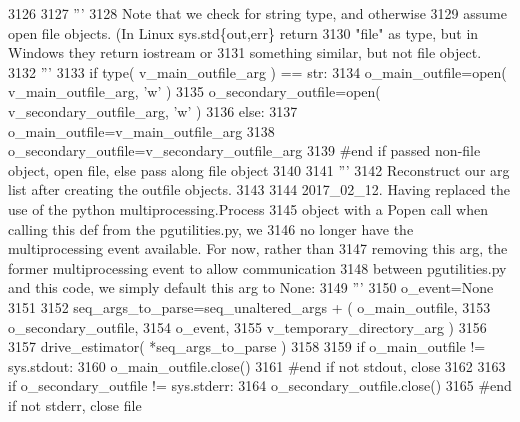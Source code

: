 \begin{DoxyCode}
3126 
3127         \textcolor{stringliteral}{'''}
3128 \textcolor{stringliteral}{        Note that we check for string type, and otherwise}
3129 \textcolor{stringliteral}{        assume open file objects. (In Linux sys.std\{out,err\} return}
3130 \textcolor{stringliteral}{        "file" as type, but in Windows they return iostream or}
3131 \textcolor{stringliteral}{        something similar, but not file object.}
3132 \textcolor{stringliteral}{        '''}
3133         \textcolor{keywordflow}{if} type( v\_main\_outfile\_arg  ) == str:
3134             o\_main\_outfile=open( v\_main\_outfile\_arg, \textcolor{stringliteral}{'w'} )
3135             o\_secondary\_outfile=open( v\_secondary\_outfile\_arg, \textcolor{stringliteral}{'w'} )
3136         \textcolor{keywordflow}{else}:
3137             o\_main\_outfile=v\_main\_outfile\_arg
3138             o\_secondary\_outfile=v\_secondary\_outfile\_arg
3139         \textcolor{comment}{#end if passed non-file object, open file, else pass along file object}
3140 
3141         \textcolor{stringliteral}{'''}
3142 \textcolor{stringliteral}{        Reconstruct our arg list after creating the outfile objects.}
3143 \textcolor{stringliteral}{}
3144 \textcolor{stringliteral}{        2017\_02\_12.  Having replaced the use of the python multiprocessing.Process}
3145 \textcolor{stringliteral}{        object with a Popen call when calling this def from the pgutilities.py, we}
3146 \textcolor{stringliteral}{        no longer have the multiprocessing event available.  For now, rather than}
3147 \textcolor{stringliteral}{        removing this arg, the former multiprocessing event to allow communication}
3148 \textcolor{stringliteral}{        between pgutilities.py and this code, we simply default this arg to None:}
3149 \textcolor{stringliteral}{        '''}
3150         o\_event=\textcolor{keywordtype}{None}
3151 
3152         seq\_args\_to\_parse=seq\_unaltered\_args + ( o\_main\_outfile, 
3153                                                     o\_secondary\_outfile, 
3154                                                                     o\_event, 
3155                                                     v\_temporary\_directory\_arg )
3156 
3157         drive\_estimator( *seq\_args\_to\_parse )
3158 
3159         \textcolor{keywordflow}{if} o\_main\_outfile != sys.stdout:
3160             o\_main\_outfile.close()
3161         \textcolor{comment}{#end if not stdout, close}
3162 
3163         \textcolor{keywordflow}{if} o\_secondary\_outfile != sys.stderr:
3164             o\_secondary\_outfile.close()
3165         \textcolor{comment}{#end if not stderr, close file}

\end{DoxyCode}
